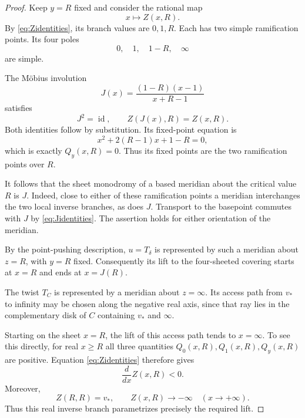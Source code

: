 \documentclass[11pt]{article}
\newcommand{\id}{\operatorname{id}}
\theoremstyle{definition}
\theoremstyle{remark}
\begin{document}
\begin{proof}
Keep $y=R$ fixed and consider the rational map
\[
x\longmapsto Z(x,R).
\]
By \eqref{eq:Zidentities}, its branch values are $0,1,R$.
Each has two simple ramification points.  Its four poles
\[
0,\quad1,\quad1-R,\quad\infty
\]
are simple.

The M\"obius involution
\begin{equation}\label{eq:involution}
J(x)=\frac{(1-R)(x-1)}{x+R-1}
\end{equation}
satisfies
\begin{equation}\label{eq:Jidentities}
J^2=\id,\qquad Z(J(x),R)=Z(x,R).
\end{equation}
Both identities follow by substitution.  Its fixed-point equation is
\[
x^2+2(R-1)x+1-R=0,
\]
which is exactly $Q_y(x,R)=0$.
Thus its fixed points are the two ramification points over $R$.

It follows that the sheet monodromy of a based meridian about the
critical value $R$ is $J$.  Indeed, close to either of these
ramification points a meridian interchanges the two local inverse
branches, as does $J$.  
Transport to the basepoint commutes with
$J$ by \eqref{eq:Jidentities}.  The assertion holds for either
orientation of the meridian.

By the point-pushing description, $u=T_\delta$ is represented by such
a meridian about $z=R$, with $y=R$ fixed.  Consequently its lift to
the four-sheeted covering starts at $x=R$ and ends at $x=J(R)$.

The twist $T_C$ is represented by a meridian about $z=\infty$.
Its access path from $v_*$ to infinity may be chosen along the negative
real axis, since that ray lies in the complementary disk of $C$
containing $v_*$ and $\infty$.

Starting on the sheet $x=R$, the lift of this access path tends to
$x=\infty$.  To see this directly, for real $x\ge R$ all three
quantities $Q_0(x,R),Q_1(x,R),Q_y(x,R)$ are positive.
Equation \eqref{eq:Zidentities} therefore gives
\[
\frac{d}{dx}Z(x,R)<0.
\]
Moreover,
\[
Z(R,R)=v_*,\qquad Z(x,R)\longrightarrow-\infty
\quad(x\longrightarrow+\infty).
\]
Thus this real inverse branch parametrizes precisely the required
lift.


\end{proof}
\end{document}
